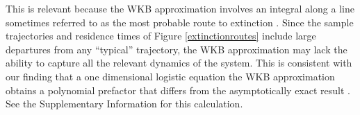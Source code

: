 \documentclass[a4paper,10pt]{article}
\numberwithin{equation}{section} %
\begin{document}
This is relevant because the WKB approximation involves an integral along a line sometimes referred to as the most probable route to extinction \cite{Assaf2016,Gottesman2012}. 
Since the sample trajectories and residence times of Figure \ref{extinctionroutes} include large departures from any ``typical'' trajectory, the WKB approximation may lack the ability to capture all the relevant dynamics of the system. 
This is consistent with our finding that
 a one dimensional logistic equation the WKB approximation obtains a polynomial prefactor that differs from the asymptotically exact result \cite{Lande1993}. %
See the Supplementary Information for this calculation. 
\end{document}
